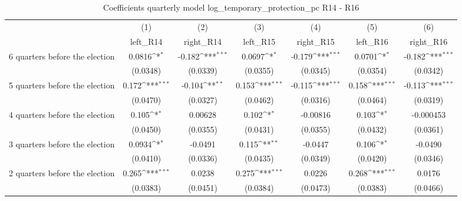 \begin{table}[htbp]\centering
\def\sym#1{\ifmmode^{#1}\else\(^{#1}\)\fi}
\caption{Coefficients quarterly model log\_temporary\_protection\_pc R14 - R16}
\begin{tabular}{l*{6}{c}}
\hline\hline
                    &\multicolumn{1}{c}{(1)}&\multicolumn{1}{c}{(2)}&\multicolumn{1}{c}{(3)}&\multicolumn{1}{c}{(4)}&\multicolumn{1}{c}{(5)}&\multicolumn{1}{c}{(6)}\\
                    &\multicolumn{1}{c}{left\_R14}&\multicolumn{1}{c}{right\_R14}&\multicolumn{1}{c}{left\_R15}&\multicolumn{1}{c}{right\_R15}&\multicolumn{1}{c}{left\_R16}&\multicolumn{1}{c}{right\_R16}\\
\hline
 6 quarters before the election&      0.0816\sym{*}  &      -0.182\sym{***}&      0.0697\sym{*}  &      -0.179\sym{***}&      0.0701\sym{*}  &      -0.182\sym{***}\\
                    &    (0.0348)         &    (0.0339)         &    (0.0355)         &    (0.0345)         &    (0.0354)         &    (0.0342)         \\
[1em]
 5 quarters before the election&       0.172\sym{***}&      -0.104\sym{**} &       0.153\sym{***}&      -0.115\sym{***}&       0.158\sym{***}&      -0.113\sym{***}\\
                    &    (0.0470)         &    (0.0327)         &    (0.0462)         &    (0.0316)         &    (0.0464)         &    (0.0319)         \\
[1em]
 4 quarters before the election&       0.105\sym{*}  &     0.00628         &       0.102\sym{*}  &    -0.00816         &       0.103\sym{*}  &   -0.000453         \\
                    &    (0.0450)         &    (0.0355)         &    (0.0431)         &    (0.0355)         &    (0.0432)         &    (0.0361)         \\
[1em]
 3 quarters before the election&      0.0934\sym{*}  &     -0.0491         &       0.115\sym{**} &     -0.0447         &       0.106\sym{*}  &     -0.0490         \\
                    &    (0.0410)         &    (0.0336)         &    (0.0435)         &    (0.0349)         &    (0.0420)         &    (0.0346)         \\
[1em]
 2 quarters before the election&       0.265\sym{***}&      0.0238         &       0.275\sym{***}&      0.0226         &       0.268\sym{***}&      0.0176         \\
                    &    (0.0383)         &    (0.0451)         &    (0.0384)         &    (0.0473)         &    (0.0383)         &    (0.0466)         \\

\end{tabular}
\end{table}
